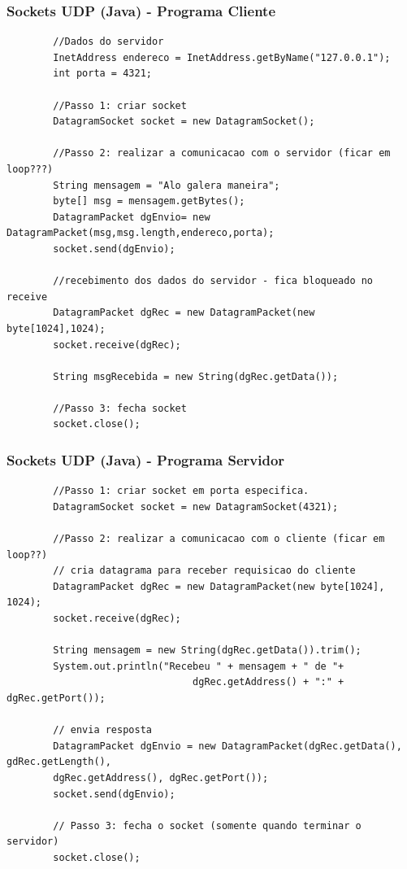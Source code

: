 \documentclass[hyperref={pdfpagelabels=false},table]{beamer}
\begin{document}
\begin{frame}[fragile]
	\frametitle{Sockets UDP (Java) - Programa Cliente}

	\begin{lstlisting}
		//Dados do servidor
		InetAddress endereco = InetAddress.getByName("127.0.0.1");
		int porta = 4321;

		//Passo 1: criar socket
		DatagramSocket socket = new DatagramSocket();
		
		//Passo 2: realizar a comunicacao com o servidor (ficar em loop???)
		String mensagem = "Alo galera maneira";
		byte[] msg = mensagem.getBytes();
		DatagramPacket dgEnvio= new DatagramPacket(msg,msg.length,endereco,porta);
		socket.send(dgEnvio);

		//recebimento dos dados do servidor - fica bloqueado no receive
		DatagramPacket dgRec = new DatagramPacket(new byte[1024],1024);
		socket.receive(dgRec); 

		String msgRecebida = new String(dgRec.getData());

		//Passo 3: fecha socket
		socket.close();
	\end{lstlisting} 

\end{frame}

\begin{frame}[fragile]
	\frametitle{Sockets UDP (Java) - Programa Servidor}

	\begin{lstlisting}
		//Passo 1: criar socket em porta especifica.
		DatagramSocket socket = new DatagramSocket(4321);

		//Passo 2: realizar a comunicacao com o cliente (ficar em loop??)
		// cria datagrama para receber requisicao do cliente
		DatagramPacket dgRec = new DatagramPacket(new byte[1024], 1024);
		socket.receive(dgRec);

		String mensagem = new String(dgRec.getData()).trim();
		System.out.println("Recebeu " + mensagem + " de "+ 
		                        dgRec.getAddress() + ":" + dgRec.getPort());
		
		// envia resposta
		DatagramPacket dgEnvio = new DatagramPacket(dgRec.getData(), gdRec.getLength(),
		dgRec.getAddress(), dgRec.getPort());
		socket.send(dgEnvio);

		// Passo 3: fecha o socket (somente quando terminar o servidor)
		socket.close();	
\end{lstlisting} 

\end{frame}

\end{document}
